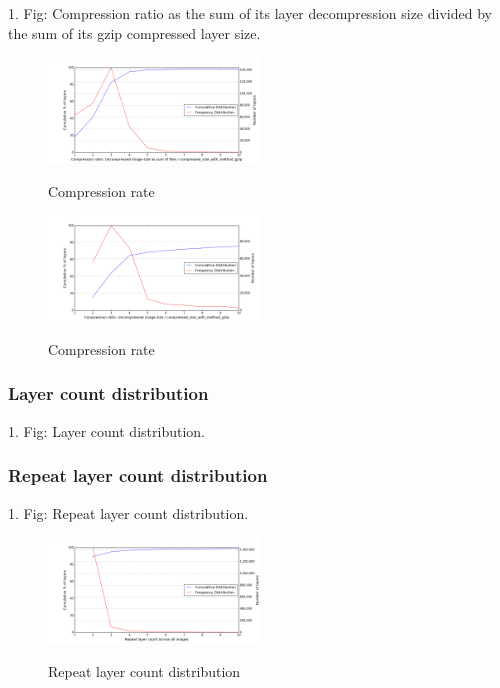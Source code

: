 1. Fig: Compression ratio as the sum of its layer decompression size divided by the sum of its gzip compressed layer size.

\begin{figure}
	\centering
	\includegraphics[width=0.5\textwidth]{graphs/distributionCompression_ratio_Uncompressed_image_size_as_sum_of_files_divided_by_compressed_size_with_method_gzip}\\
	\caption{Compression rate}\label{fig_image_size_compression}
\end{figure}

\begin{figure}
	\centering
	\includegraphics[width=0.5\textwidth]{graphs/distributionCompression_ratio_Uncompressed_image_size_divided_by_compressed_size_with_method_gzip.png}\\
	\caption{Compression rate}\label{fig_image_size_compression}
\end{figure}

\subsubsection{Layer count distribution}

1. Fig: Layer count distribution.


\subsubsection{Repeat layer count distribution}

1. Fig: Repeat layer count distribution.

\begin{figure}
	\centering
	\includegraphics[width=0.5\textwidth]{graphs/distributionRepeat_layer_count_across_all_images}\\
	\caption{Repeat layer count distribution}\label{fig_image_size_compression}
\end{figure}

